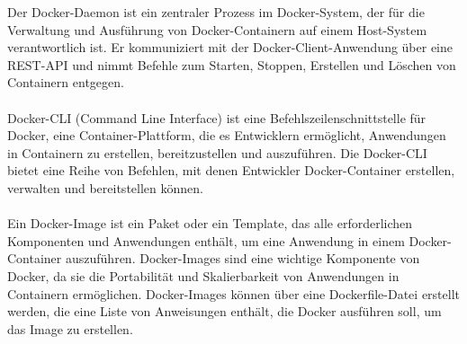 \documentclass[../vs-script-first-v01.tex]{subfiles}
\begin{document}
Der Docker-Daemon ist ein zentraler Prozess im Docker-System, der für die Verwaltung und Ausführung von Docker-Containern auf einem Host-System verantwortlich ist. Er kommuniziert mit der Docker-Client-Anwendung über eine REST-API und nimmt Befehle zum Starten, Stoppen, Erstellen und Löschen von Containern entgegen.
\\\\
Docker-CLI (Command Line Interface) ist eine Befehlszeilenschnittstelle für Docker, eine Container-Plattform, die es Entwicklern ermöglicht, Anwendungen in Containern zu erstellen, bereitzustellen und auszuführen. Die Docker-CLI bietet eine Reihe von Befehlen, mit denen Entwickler Docker-Container erstellen, verwalten und bereitstellen können.
\\\\
Ein Docker-Image ist ein Paket oder ein Template, das alle erforderlichen Komponenten und Anwendungen enthält, um eine Anwendung in einem Docker-Container auszuführen. Docker-Images sind eine wichtige Komponente von Docker, da sie die Portabilität und Skalierbarkeit von Anwendungen in Containern ermöglichen. Docker-Images können über eine Dockerfile-Datei erstellt werden, die eine Liste von Anweisungen enthält, die Docker ausführen soll, um das Image zu erstellen.
\end{document}
